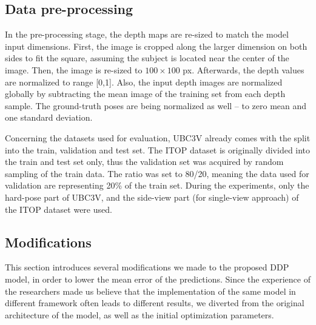 \subsection{Data pre-processing}

In the pre-processing stage, the depth maps are re-sized to match the model input dimensions. First, the image is cropped along the larger dimension on both sides to fit the square, assuming the subject is located near the center of the image. Then, the image is re-sized to $100\times100$ px. Afterwards, the depth values are normalized to range [0,1]. Also, the input depth images are normalized globally by subtracting the mean image of the training set from each depth sample. The ground-truth poses are being normalized as well – to zero mean and one standard deviation.\par
\vspace{5mm}
\noindent 
Concerning the datasets used for evaluation, UBC3V already comes with the split into the train, validation and test set. The ITOP dataset is originally divided into the train and test set only, thus the validation set was acquired by random sampling of the train data. The ratio was set to 80/20, meaning the data used for validation are representing 20\% of the train set. During the experiments, only the hard-pose part of UBC3V, and the side-view part (for single-view approach) of the ITOP dataset were used.

%

\subsection{Modifications}
This section introduces several modifications we made to the proposed DDP model, in order to lower the mean error of the predictions. Since the experience of the researchers made us believe that the implementation of the same model in different framework often leads to different results, we diverted from the original architecture of the model, as well as the initial optimization parameters.\par
\vspace{5mm}

